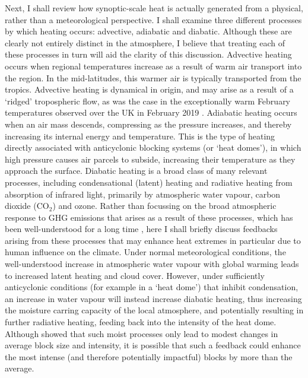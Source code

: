   Next, I shall review how synoptic-scale heat is actually generated from a physical, rather than a meteorological perspective. I shall examine three different processes by which heating occurs: advective, adiabatic and diabatic. Although these are clearly not entirely distinct in the atmosphere, I believe that treating each of these processes in turn will aid the clarity of this discussion. Advective heating occurs when regional temperatures increase as a result of warm air transport into the region. In the mid-latitudes, this warmer air is typically transported from the tropics. Advective heating is dynamical in origin, and may arise as a result of a `ridged' tropospheric flow, as was the case in the exceptionally warm February temperatures observed over the UK in February 2019 \citep{young_record-breaking_2020,leach_forecast-based_2021}. Adiabatic heating occurs when an air mass descends, compressing as the pressure increases, and thereby increasing its internal energy and temperature. This is the type of heating directly associated with anticyclonic blocking systems (or `heat domes'), in which high pressure causes air parcels to subside, increasing their temperature as they approach the surface. Diabatic heating is a broad class of many relevant processes, including condensational (latent) heating and radiative heating from absorption of infrared light, primarily by atmospheric water vapour, carbon dioxide (CO$_2$) and ozone. Rather than focussing on the broad atmospheric response to GHG emissions that arises as a result of these processes, which has been well-understood for a long time \citep{arrhenius_influence_1896}, here I shall briefly discuss feedbacks arising from these processes that may enhance heat extremes in particular due to human influence on the climate. Under normal meteorological conditions, the well-understood increase in atmospheric water vapour with global warming \citep{allen_constraints_2002} leads to increased latent heating and cloud cover. However, under sufficiently anticyclonic conditions (for example in a `heat dome') that inhibit condensation, an increase in water vapour will instead increase diabatic heating, thus increasing the moisture carring capacity of the local atmosphere, and potentially resulting in further radiative heating, feeding back into the intensity of the heat dome. Although \citet{steinfeld_response_2022} showed that such moist processes only lead to modest changes in average block size and intensity, it is possible that such a feedback could enhance the most intense (and therefore potentially impactful) blocks by more than the average.

